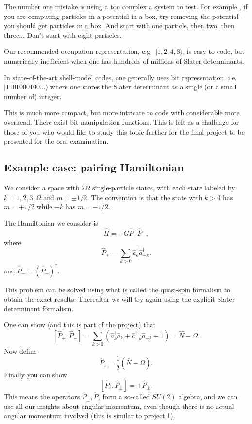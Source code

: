 \documentclass[graybox,sectrefs,envcountresetchap,open=right]{svmonodo}
\begin{document}
\noindent
The number one mistake is using a too complex a system to test. For example ,
if you are computing particles in a potential in a box, try removing the potential--you should get 
particles in a box. And start with one particle, then two, then three... Don't start with 
eight particles.


Our recommended occupation representation, e.g.~$| 1,2,4,8 \rangle$, is 
easy to code, but numerically inefficient when one has hundreds of 
millions of Slater determinants.


In state-of-the-art shell-model codes, one generally uses bit 
representation, i.e.~$|1101000100... \rangle$ where one stores 
the Slater determinant as a single (or a small number of) integer.


This is much more compact, but more intricate to code with considerable 
more overhead. There exist 
bit-manipulation functions. 
This is left as a challenge for those of you who would like to study this topic further for the final project to be presented for the oral examination.


\subsection{Example case: pairing Hamiltonian}

We consider a space with $2\Omega$ single-particle states, with each 
state labeled by 
$k = 1, 2, 3, \Omega$ and $m = \pm 1/2$. The convention is that 
the state with $k>0$ has $m = + 1/2$ while $-k$ has $m = -1/2$.


The Hamiltonian we consider is 
\[
\hat{H} = -G \hat{P}_+ \hat{P}_-,
\]
where
\[
\hat{P}_+ = \sum_{k > 0} \hat{a}^\dagger_k \hat{a}^\dagger_{-{k}}.
\]
and $\hat{P}_- = ( \hat{P}_+)^\dagger$.

This problem can be solved using what is called the quasi-spin formalism to obtain the 
exact results. Thereafter we will try again using the explicit Slater determinant formalism.


One can show (and this is part of the project) that
\[
\left [ \hat{P}_+, \hat{P}_- \right ] = \sum_{k> 0} \left( \hat{a}^\dagger_k \hat{a}_k 
+ \hat{a}^\dagger_{-{k}} \hat{a}_{-{k}} - 1 \right) = \hat{N} - \Omega.
\]
Now define 
\[
\hat{P}_z = \frac{1}{2} ( \hat{N} -\Omega).
\]
Finally you can show
\[
\left [ \hat{P}_z , \hat{P}_\pm \right ] = \pm \hat{P}_\pm.
\]
This means the operators $\hat{P}_\pm, \hat{P}_z$ form a so-called  $SU(2)$ algebra, and we can 
use all our insights about angular momentum, even though there is no actual 
angular momentum involved (this is similar to project 1).
\end{document}
